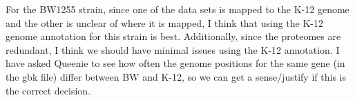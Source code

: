 \documentclass[12pt]{article}
\newcommand{\smel}{\textit{S.\,meliloti}\xspace}
\newcommand{\p}{progressiveMauve\xspace}
\newcommand{\strep}{\textit{Streptomyces}\xspace}
\newcommand{\ecol}{\textit{E.\,coli}\xspace}
\newcommand{\ecoli}{\textit{Escherichia coli}\xspace}
\newcommand{\pa}{pSymA\xspace}
\newcommand{\dn}{\textit{dN}\xspace}
\begin{document}
For the BW1255 strain, since one of the data sets is mapped to the K-12 genome and the other is unclear of where it is mapped, I think that using the K-12 genome annotation for this strain is best.
Additionally, since the proteomes are redundant, I think we should have minimal issues using the K-12 annotation.
I have asked Queenie to see how often the genome positions for the same gene (in the gbk file) differ between BW and K-12, so we can get a sense/justify if this is the correct decision.

\end{document}
